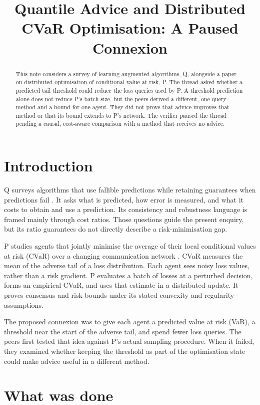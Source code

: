 \documentclass{article}
\title{Quantile Advice and Distributed CVaR Optimisation: A Paused Connexion}
\begin{document}
\maketitle

\begin{abstract}
This note considers a survey of learning-augmented algorithms, Q, alongside a paper on distributed
optimisation of conditional value at risk, P. The thread asked whether a predicted tail threshold could
reduce the loss queries used by P. A threshold prediction alone does not reduce P's batch size, but the
peers derived a different, one-query method and a bound for one agent. They did not prove that advice
improves that method or that its bound extends to P's network. The verifier paused the thread pending a
causal, cost-aware comparison with a method that receives no advice.
\end{abstract}

\section{Introduction}

Q surveys algorithms that use fallible predictions while retaining guarantees when predictions fail
\cite{Q}. It asks what is predicted, how error is measured, and what it costs to obtain and use a
prediction. Its consistency and robustness language is framed mainly through cost ratios. Those questions
guide the present enquiry, but its ratio guarantees do not directly describe a risk-minimisation gap.

P studies agents that jointly minimise the average of their local conditional values at risk (CVaR) over
a changing communication network \cite{P}. CVaR measures the mean of the adverse tail of a loss
distribution. Each agent sees noisy loss values, rather than a risk gradient. P evaluates a batch of
losses at a perturbed decision, forms an empirical CVaR, and uses that estimate in a distributed update.
It proves consensus and risk bounds under its stated convexity and regularity assumptions.

The proposed connexion was to give each agent a predicted value at risk (VaR), a threshold near the start
of the adverse tail, and spend fewer loss queries. The peers first tested that idea against P's actual
sampling procedure. When it failed, they examined whether keeping the threshold as part of the
optimisation state could make advice useful in a different method.

\section{What was done}
\end{document}
